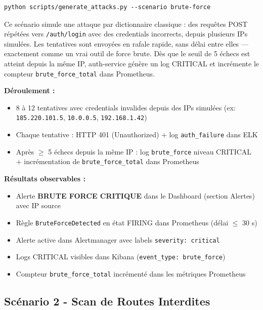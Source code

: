 \documentclass[12pt, a4paper]{report}
\newcommand{\cmark}{\ding{51}}
\begin{document}
\begin{lstlisting}[style=bash, caption={Lancement du scénario brute force}]
python scripts/generate_attacks.py --scenario brute-force
\end{lstlisting}

\medskip
Ce scénario simule une attaque par dictionnaire classique : des requêtes POST répétées vers \texttt{/auth/login} avec des credentials incorrects, depuis plusieurs IPs simulées. Les tentatives sont envoyées en rafale rapide, sans délai entre elles — exactement comme un vrai outil de force brute. Dès que le seuil de 5 échecs est atteint depuis la même IP, auth-service génère un log CRITICAL et incrémente le compteur \texttt{brute\_force\_total} dans Prometheus.

\textbf{Déroulement :}
\begin{itemize}[leftmargin=*]
  \item 8 à 12 tentatives avec credentials invalides depuis des IPs simulées (ex: \texttt{185.220.101.5}, \texttt{10.0.0.5}, \texttt{192.168.1.42})
  \item Chaque tentative : HTTP 401 (Unauthorized) + log \texttt{auth\_failure} dans ELK
  \item Après $\geq$ 5 échecs depuis la même IP : log \texttt{brute\_force} niveau CRITICAL + incrémentation de \texttt{brute\_force\_total} dans Prometheus
\end{itemize}

\textbf{Résultats observables :}
\begin{itemize}[leftmargin=*]
  \item[\cmark] Alerte \textbf{BRUTE FORCE CRITIQUE} dans le Dashboard (section Alertes) avec IP source
  \item[\cmark] Règle \texttt{BruteForceDetected} en état FIRING dans Prometheus (délai $\leq$ 30 s)
  \item[\cmark] Alerte active dans Alertmanager avec labels \texttt{severity: critical}
  \item[\cmark] Logs CRITICAL visibles dans Kibana (\texttt{event\_type: brute\_force})
  \item[\cmark] Compteur \texttt{brute\_force\_total} incrémenté dans les métriques Prometheus
\end{itemize}

\subsection{Scénario 2 - Scan de Routes Interdites}
\end{document}
